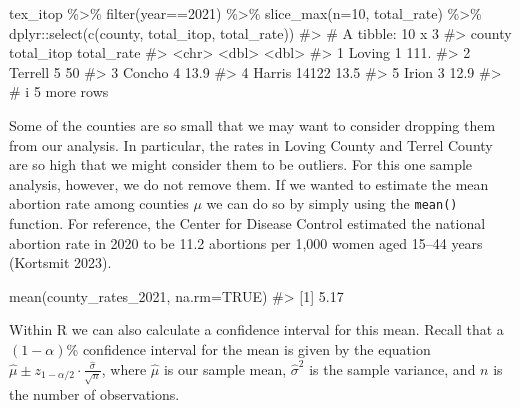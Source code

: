 \documentclass[
  letterpaper,
]{krantz}
\makeatletter
\newenvironment{Shaded}{\begin{snugshade}}{\end{snugshade}}
\newcommand{\AttributeTok}[1]{\textcolor[rgb]{0.40,0.45,0.13}{#1}}
\newcommand{\CommentTok}[1]{\textcolor[rgb]{0.37,0.37,0.37}{#1}}
\newcommand{\ConstantTok}[1]{\textcolor[rgb]{0.56,0.35,0.01}{#1}}
\newcommand{\DecValTok}[1]{\textcolor[rgb]{0.68,0.00,0.00}{#1}}
\newcommand{\FunctionTok}[1]{\textcolor[rgb]{0.28,0.35,0.67}{#1}}
\newcommand{\NormalTok}[1]{\textcolor[rgb]{0.00,0.23,0.31}{#1}}
\newcommand{\SpecialCharTok}[1]{\textcolor[rgb]{0.37,0.37,0.37}{#1}}
\newenvironment{kframe}{%
\medskip{}
\setlength{\fboxsep}{.8em}
 \def\at@end@of@kframe{}%
 \ifinner\ifhmode%
  \def\at@end@of@kframe{\end{minipage}}%
  \begin{minipage}{\columnwidth}%
 \fi\fi%
 \def\FrameCommand##1{\hskip\@totalleftmargin \hskip-\fboxsep
 \colorbox{shadecolor}{##1}\hskip-\fboxsep
     \hskip-\linewidth \hskip-\@totalleftmargin \hskip\columnwidth}%
 \MakeFramed {\advance\hsize-\width
   \@totalleftmargin\z@ \linewidth\hsize
   \@setminipage}}%
 {\par\unskip\endMakeFramed%
 \at@end@of@kframe}
\renewenvironment{Shaded}{\begin{kframe}}{\end{kframe}}
\makeatother
\begin{document}
\begin{Shaded}
\begin{Highlighting}[]
\NormalTok{tex\_itop }\SpecialCharTok{\%\textgreater{}\%} 
  \FunctionTok{filter}\NormalTok{(year}\SpecialCharTok{==}\DecValTok{2021}\NormalTok{) }\SpecialCharTok{\%\textgreater{}\%} 
  \FunctionTok{slice\_max}\NormalTok{(}\AttributeTok{n=}\DecValTok{10}\NormalTok{, total\_rate) }\SpecialCharTok{\%\textgreater{}\%}
\NormalTok{  dplyr}\SpecialCharTok{::}\FunctionTok{select}\NormalTok{(}\FunctionTok{c}\NormalTok{(county, total\_itop, total\_rate))}
\CommentTok{\#\textgreater{} \# A tibble: 10 x 3}
\CommentTok{\#\textgreater{}   county  total\_itop total\_rate}
\CommentTok{\#\textgreater{}   \textless{}chr\textgreater{}        \textless{}dbl\textgreater{}      \textless{}dbl\textgreater{}}
\CommentTok{\#\textgreater{} 1 Loving           1      111. }
\CommentTok{\#\textgreater{} 2 Terrell          5       50  }
\CommentTok{\#\textgreater{} 3 Concho           4       13.9}
\CommentTok{\#\textgreater{} 4 Harris       14122       13.5}
\CommentTok{\#\textgreater{} 5 Irion            3       12.9}
\CommentTok{\#\textgreater{} \# i 5 more rows}
\end{Highlighting}
\end{Shaded}

Some of the counties are so small that we may want to consider dropping
them from our analysis. In particular, the rates in Loving County and
Terrel County are so high that we might consider them to be outliers.
For this one sample analysis, however, we do not remove them. If we
wanted to estimate the mean abortion rate among counties \(\mu\) we can
do so by simply using the \texttt{mean()} function. For reference, the
Center for Disease Control estimated the national abortion rate in 2020
to be 11.2 abortions per 1,000 women aged 15--44 years (Kortsmit 2023).

\begin{Shaded}
\begin{Highlighting}[]
\FunctionTok{mean}\NormalTok{(county\_rates\_2021, }\AttributeTok{na.rm=}\ConstantTok{TRUE}\NormalTok{)}
\CommentTok{\#\textgreater{} [1] 5.17}
\end{Highlighting}
\end{Shaded}

Within R we can also calculate a confidence interval for this mean.
Recall that a \((1-\alpha)\)\% confidence interval for the mean is given
by the equation
\(\hat{\mu} \pm z_{1-\alpha/2} \cdot \frac{\hat{\sigma}}{\sqrt{n}}\),
where \(\hat{\mu}\) is our sample mean, \(\hat{\sigma}^2\) is the sample
variance, and \(n\) is the number of observations.
\end{document}
